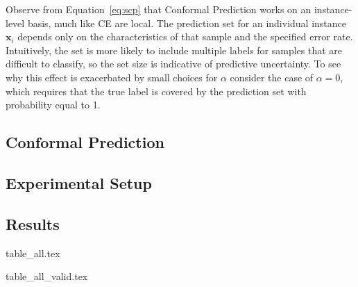 \documentclass{article}
\begin{document}
Observe from Equation~\ref{eq:scp} that Conformal Prediction works on an instance-level basis, much like CE are local. The prediction set for an individual instance $\mathbf{x}_i$ depends only on the characteristics of that sample and the specified error rate. Intuitively, the set is more likely to include multiple labels for samples that are difficult to classify, so the set size is indicative of predictive uncertainty. To see why this effect is exacerbated by small choices for $\alpha$ consider the case of $\alpha=0$, which requires that the true label is covered by the prediction set with probability equal to 1.

\subsection{Conformal Prediction}\label{app:eccco}

\subsection{Experimental Setup}\label{app:setup}
\subsection{Results}\label{app:results}

{table_all.tex}

{table_all_valid.tex}
\end{document}
